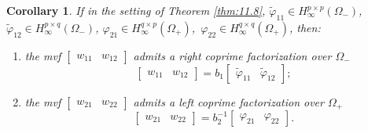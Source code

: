 \documentclass[12pt,twoside,a4paper]{amsart}
\newtheorem{corollary}[thm]{Corollary}
\theoremstyle{definition}
\numberwithin{equation}{section}
\begin{document}
\begin{corollary}
\label{cor:jun2b8} If in the setting of Theorem \ref{thm:11.8},
${{{\widetilde \varphi} }}_{11}\in H_\infty^{p\times p}(\Omega_-)$,\,
  ${{{\widetilde \varphi} }}_{12}\in H_\infty^{p\times q}(\Omega_-)$,
$\varphi_{21}\in H_\infty^{q\times p}(\Omega_+)$,\, $\varphi_{22}\in
H_\infty^{q\times q}(\Omega_+)$, then:
\begin{enumerate}
\item[(1)]
the mvf $\begin{bmatrix}w_{11}& w_{12}\end{bmatrix}$ admits a right
coprime factorization over $\Omega_-$
\begin{equation}\label{eq:7.43}
 \begin{bmatrix}w_{11} & w_{12}\end{bmatrix}
 =b_1\begin{bmatrix}{{{\widetilde \varphi} }}_{11}& {{{\widetilde \varphi} }}_{12}\end{bmatrix};
\end{equation}
\item[(2)]
the mvf
 $\begin{bmatrix}w_{21} & w_{22}\end{bmatrix}$ admits a left coprime
factorization over $\Omega_+$
\begin{equation}\label{eq:7.41}
 \begin{bmatrix}w_{21}& w_{22}\end{bmatrix}=
b_2^{-1}\begin{bmatrix}\varphi_{21}&\varphi_{22}\end{bmatrix}.
\end{equation}
\end{enumerate}
\end{corollary}
\end{document}
